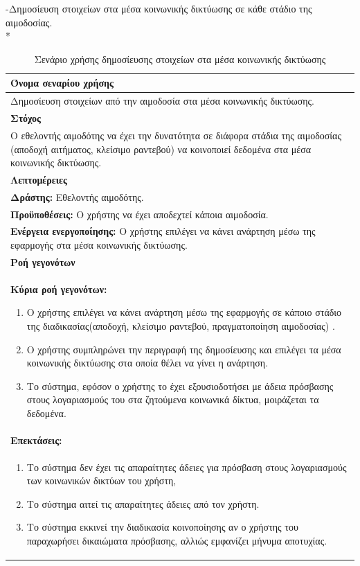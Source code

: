 -Δημοσίευση στοιχείων στα μέσα κοινωνικής δικτύωσης σε κάθε στάδιο της αιμοδοσίας.
\\*
\begin{table}[H]	
	\begin{center}
	    \begin{tabular}{|p{\dimexpr \linewidth-2\tabcolsep}|}
	    \hline
	    \rowcolor{grayy}
	    \textbf{Όνομα σεναρίου χρήσης}
	    \\ \hline    
	    Δημοσίευση στοιχείων από την αιμοδοσία στα μέσα κοινωνικής δικτύωσης.
	     \\ \hline
	    \rowcolor{grayy}
	   \textbf{Στόχος}
	    \\ \hline
	 	 Ο εθελοντής αιμοδότης να έχει την δυνατότητα σε διάφορα στάδια της αιμοδοσίας (αποδοχή αιτήματος, κλείσιμο ραντεβού) να κοινοποιεί δεδομένα στα μέσα κοινωνικής δικτύωσης.
	    \\ \hline
	    \rowcolor{grayy}
	    \textbf{Λεπτομέρειες}
	    \\ \hline
		\textbf{Δράστης:} Εθελοντής αιμοδότης.
		\\*
		\textbf{Προϋποθέσεις:} Ο χρήστης να έχει αποδεχτεί κάποια αιμοδοσία.
		\\*
		\textbf{Ενέργεια ενεργοποίησης:} Ο χρήστης επιλέγει να κάνει ανάρτηση μέσω της εφαρμογής στα μέσα κοινωνικής δικτύωσης.
		\\ \hline
		\rowcolor{grayy}    
	    \textbf{Ροή γεγονότων}
	    \\ \hline
		\textbf{Κύρια ροή γεγονότων:}
		\begin{enumerate}
		\item	 Ο χρήστης επιλέγει να κάνει ανάρτηση μέσω της εφαρμογής σε κάποιο στάδιο της διαδικασίας(αποδοχή, κλείσιμο ραντεβού, πραγματοποίηση αιμοδοσίας) .
		\item Ο χρήστης συμπληρώνει την περιγραφή της δημοσίευσης και επιλέγει τα μέσα κοινωνικής δικτύωσης στα οποία θέλει να γίνει η ανάρτηση.
	   \item Το σύστημα, εφόσον ο χρήστης το έχει εξουσιοδοτήσει με άδεια πρόσβασης στους λογαριασμούς του στα ζητούμενα κοινωνικά δίκτυα, μοιράζεται τα δεδομένα.
		\end{enumerate}
		\\*
		\textbf{Επεκτάσεις:}
		   \\ \hline
		\begin{enumerate}
			\item Το σύστημα δεν έχει τις απαραίτητες άδειες για πρόσβαση στους λογαριασμούς των κοινωνικών δικτύων του χρήστη,
			\item Το σύστημα αιτεί τις απαραίτητες άδειες από τον χρήστη.
			\item Το σύστημα εκκινεί την διαδικασία κοινοποίησης αν ο χρήστης του παραχωρήσει δικαιώματα πρόσβασης, αλλιώς εμφανίζει μήνυμα αποτυχίας.
		\end{enumerate}
		\\ \hline
	    \end{tabular}
	    \caption{Σενάριο χρήσης δημοσίευσης στοιχείων στα μέσα κοινωνικής δικτύωσης}
	    \label{tab:share_to_social_media} 
	\end{center}
\end{table}		

